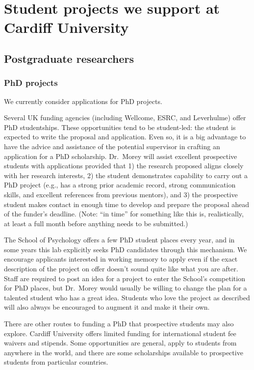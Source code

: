 \documentclass[
  12pt,
]{book}
\begin{document}
\chapter{Student projects we support at Cardiff University}\label{student-projects-we-support-at-cardiff-university}

\section{Postgraduate researchers}\label{postgraduate-researchers}

\subsection{PhD projects}\label{phd-projects}

We currently consider applications for PhD projects.

Several UK funding agencies (including Wellcome, ESRC, and Leverhulme) offer PhD studentships. These opportunities tend to be student-led: the student is expected to write the proposal and application. Even so, it is a big advantage to have the advice and assistance of the potential supervisor in crafting an application for a PhD scholarship. Dr.~Morey will assist excellent prospective students with applications provided that 1) the research proposed aligns closely with her research interests, 2) the student demonstrates capability to carry out a PhD project (e.g., has a strong prior academic record, strong communication skills, and excellent references from previous mentors), and 3) the prospective student makes contact in enough time to develop and prepare the proposal ahead of the funder's deadline. (Note: ``in time'' for something like this is, realistically, at least a full month before anything needs to be submitted.)

The School of Psychology offers a few PhD student places every year, and in some years this lab explicitly seeks PhD candidates through this mechanism. We encourage applicants interested in working memory to apply even if the exact description of the project on offer doesn't sound quite like what you are after. Staff are required to post an idea for a project to enter the School's competition for PhD places, but Dr.~Morey would usually be willing to change the plan for a talented student who has a great idea. Students who love the project as described will also always be encouraged to augment it and make it their own.

There are other routes to funding a PhD that prospective students may also explore. Cardiff University offers limited funding for international student fee waivers and stipends. Some opportunities are general, apply to students from anywhere in the world, and there are some scholarships available to prospective students from particular countries.
\end{document}
